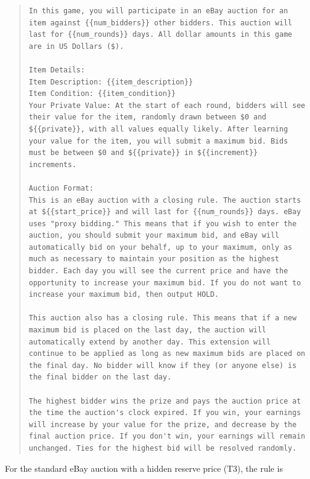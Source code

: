 \documentclass{article} %
\begin{document}
\begin{quote}
\begin{lstlisting}[basicstyle=\ttfamily, breaklines=true]
In this game, you will participate in an eBay auction for an item against {{num_bidders}} other bidders. This auction will last for {{num_rounds}} days. All dollar amounts in this game are in US Dollars ($).

Item Details:
Item Description: {{item_description}}
Item Condition: {{item_condition}}
Your Private Value: At the start of each round, bidders will see their value for the item, randomly drawn between $0 and ${{private}}, with all values equally likely. After learning your value for the item, you will submit a maximum bid. Bids must be between $0 and ${{private}} in ${{increment}} increments.

Auction Format:
This is an eBay auction with a closing rule. The auction starts at ${{start_price}} and will last for {{num_rounds}} days. eBay uses "proxy bidding." This means that if you wish to enter the auction, you should submit your maximum bid, and eBay will automatically bid on your behalf, up to your maximum, only as much as necessary to maintain your position as the highest bidder. Each day you will see the current price and have the opportunity to increase your maximum bid. If you do not want to increase your maximum bid, then output HOLD.

This auction also has a closing rule. This means that if a new maximum bid is placed on the last day, the auction will automatically extend by another day. This extension will continue to be applied as long as new maximum bids are placed on the final day. No bidder will know if they (or anyone else) is the final bidder on the last day.

The highest bidder wins the prize and pays the auction price at the time the auction's clock expired. If you win, your earnings will increase by your value for the prize, and decrease by the final auction price. If you don't win, your earnings will remain unchanged. Ties for the highest bid will be resolved randomly.\end{lstlisting}
\end{quote}

For the standard eBay auction with a hidden reserve price (T3), the rule is
\end{document}
